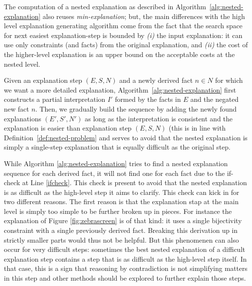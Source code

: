 The computation of a nested explanation as described in Algorithm~\ref{alg:nested-explanation} also reuses \textit{min-explanation}; but, the main differences with the high level explanation generating algorithm come from the fact that the search space for next easiest explanation-step is bounded by \emph{(i)} the input explanation: it can use only constraints (and facts) from the original explanation, and \emph{(ii)} the cost of the higher-level explanation is an upper bound on the acceptable costs at the nested level. 

Given an explanation step $(E, S, N)$ and a newly derived fact $n \in N$ for which we want a more detailed explanation, Algorithm~\ref{alg:nested-explanation} first constructs a partial interpretation $I'$ formed by the facts in $E$ and the negated new fact $n$. 
Then, we gradually build the sequence by adding the newly found explanations $(E', S', N')$ as long as the interpretation is consistent and the explanation is easier than explanation step $(E, S, N)$ (this is in line with Definition~\ref{def:nested-problem} and serves to avoid that the nested explanation is simply a single-step explanation that is equally difficult as the original step.  

While Algorithm \ref{alg:nested-explanation} tries to find a nested explanation sequence for each derived fact, it will not find one for each fact due to the if-check at Line \ref{ifcheck}. This check is present to avoid that the nested explanation is as difficult as the high-level step it aims to clarify. This check can kick in for two different reasons. The first reason is that the explanation stap at the main level is simply too simple to be further broken up in pieces. For instance the explanation of Figure \ref{fig:zebrascreen} is of that kind: it uses a single bijectivity constraint with a single previously derived fact. Breaking this derivation up in strictly smaller parts would thus not be helpful. But this phenomenen can also occur for very difficult steps: sometimes the best nested explanation of a difficult explanation step contains a step that is as difficult as the high-level step itself. In that case, this is a sign that reasoning by contradiction is not simplifying matters in this step and other methods should be explored to further explain those steps. 

